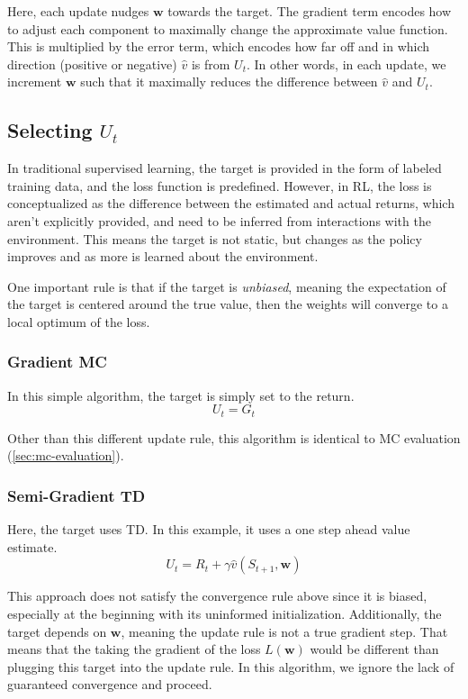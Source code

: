 \documentclass{article}
\begin{document}
Here, each update nudges $\bm{w}$ towards the target. The gradient term encodes how to adjust each component to maximally change the approximate value function.
This is multiplied by the error term, which encodes how far off and in which direction (positive or negative) $\hat{v}$ is from $U_t$.
In other words, in each update, we increment $\bm{w}$ such that it maximally reduces the difference between $\hat{v}$ and $U_t$.

\subsection{Selecting $U_t$}
In traditional supervised learning, the target is provided in the form of labeled training data, and the loss function is predefined. 
However, in RL, the loss is conceptualized as the difference between the estimated and actual returns, which aren't explicitly provided,
and need to be inferred from interactions with the environment. This means the target is not static, but changes as the policy improves 
and as more is learned about the environment.

One important rule is that if the target is \emph{unbiased}, meaning the expectation of the target is centered around the true value, then the weights
will converge to a local optimum of the loss. 

\subsubsection{Gradient MC}
In this simple algorithm, the target is simply set to the return.
\begin{equation}
  U_t = G_t
\end{equation}

Other than this different update rule, this algorithm is identical to MC evaluation (\ref{sec:mc-evaluation}).

\subsubsection{Semi-Gradient TD}
Here, the target uses TD. In this example, it uses a one step ahead value estimate.
\begin{equation}
  U_t = R_t + \gamma \hat{v}(S_{t+1}, \bm{w})
\end{equation}

This approach does not satisfy the convergence rule above since it is biased, especially at the beginning with its uninformed initialization.
Additionally, the target depends on $\bm{w}$, meaning the update rule is not a true gradient step. That means that the taking the gradient of the loss
$L(\bm{w})$ would be different than plugging this target into the update rule. In this algorithm, we ignore the lack of guaranteed convergence and
proceed.
\end{document}
